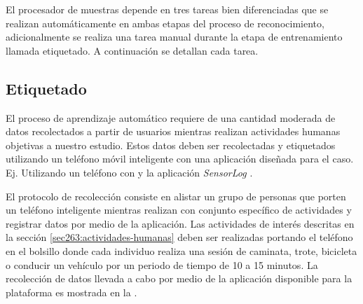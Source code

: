 El procesador de muestras depende en tres tareas bien diferenciadas
que se realizan automáticamente en ambas etapas del proceso de reconocimiento,
adicionalmente se realiza una tarea manual durante la etapa de entrenamiento
llamada etiquetado. A continuación se detallan cada tarea.

\subsection{Etiquetado}

\label{ssec44:labeling}El proceso de aprendizaje automático requiere
de una cantidad moderada de datos recolectados a partir de usuarios
mientras realizan actividades humanas objetivas a nuestro estudio.
Estos datos deben ser recolectadas y etiquetados utilizando un teléfono
móvil inteligente con una aplicación diseñada para el caso. Ej. Utilizando
un teléfono con  y la aplicación \emph{SensorLog} \cite{SLog2016}. 

El protocolo de recolección consiste en alistar un grupo de personas
que porten un teléfono inteligente mientras realizan con conjunto
específico de actividades y registrar datos por medio de la aplicación.
Las actividades de interés descritas en la sección \ref{sec263:actividades-humanas}
deben ser realizadas portando el teléfono en el bolsillo donde cada
individuo realiza una sesión de caminata, trote, bicicleta o conducir
un vehículo por un periodo de tiempo de 10 a 15 minutos. La recolección
de datos llevada a cabo por medio de la aplicación disponible para
la plataforma  es mostrada en la . 

